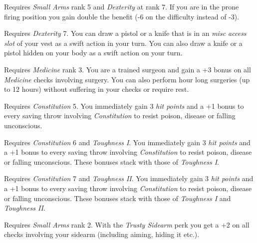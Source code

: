 \begin{description}
   Requires \emph{Small Arms} rank 5 and \emph{Dexterity}
  at rank 7. If you are in the prone firing position you gain double the
  benefit (-6 on the difficulty instead of -3).

   Requires \emph{Dexterity} 7. You can draw a
  pistol or a knife that is in an \emph{misc access slot} of your vest as a
  swift action in your turn. You can also draw a knife or a pistol hidden on
  your body as a swift action on your turn.

   Requires \emph{Medicine} rank 3. You are a trained
  surgeon and gain a +3 bonus on all \emph{Medicine} checks involving
  surgery. You can also perform hour long surgeries (up to 12 hours)
  without suffering in your checks or require rest.

   Requires \emph{Constitution} 5. You immediately gain
  3 \emph{hit points} and a +1 bonus to every saving throw involving
  \emph{Constitution} to resist poison, disease or falling unconscious.

   Requires \emph{Constitution} 6 and \emph{Toughness
    I}. You immediately gain 3 \emph{hit points} and a +1 bonus to every
  saving throw involving \emph{Constitution} to resist poison, disease or
  falling unconscious. These bonuses stack with those of \emph{Toughness I}.

   Requires \emph{Constitution} 7 and \emph{Toughness
    II}. You immediately gain 3 \emph{hit points} and a +1 bonus to every
  saving throw involving \emph{Constitution} to resist poison, disease or
  falling unconscious. These bonuses stack with those of \emph{Toughness I} and
  \emph{Toughness II}.

   Requires \emph{Small Arms} rank 2. With the
  \emph{Trusty Sidearm} perk you get a +2 on all checks involving your
  sidearm (including aiming, hiding it etc.).

\end{description}
